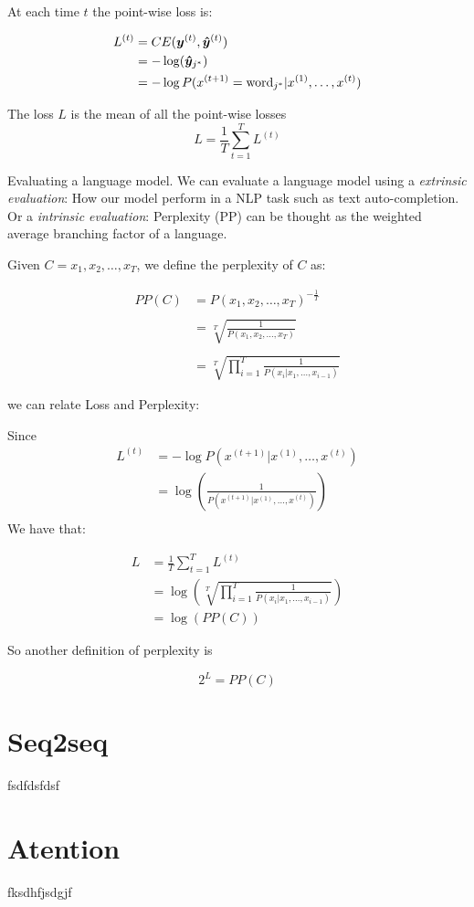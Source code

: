 At each time $t$ the point-wise loss is:

\vspace{0.2cm}

\begin{align}
L^{(t)} &= CE(\bm{y}^{(t)},\bm{\hat{y}}^{(t)})\\
    &= - \log(\bm{\hat{y}}_{j^{*}})\\
        &= - \log P(x^{(t+1)} = \text{word}_{j^{*}}|x^{(1)}, \dots, x^{(t)})
\end{align}

The loss $L$ is the mean of all the point-wise losses
\begin{equation}
L=\frac{1}{T}\sum_{t=1}^{T}L^{(t)}
\end{equation}


Evaluating a language model. We can evaluate a  language model using a \textit{extrinsic evaluation}: How our model perform in a NLP task such as text auto-completion. Or a \textit{intrinsic evaluation}: Perplexity (PP) can be thought as the weighted average branching factor of a language.


Given $C= x_1, x_2, \dots, x_T$, we define the perplexity of $C$ as:

\begin{align}
PP(C) &= P(x_1, x_2, \dots, x_T)^{-\frac{1}{T}}\\
    & \\
      &= \sqrt[T]{\frac{1}{P(x_1, x_2, \dots, x_T)}}\\
      & \\
      &= \sqrt[T]{\prod_{i=1}^{T}\frac{1}{P(x_i \vert x_1,\dots, x_{i-1})}}
\end{align}

we can relate Loss and Perplexity:

Since
\begin{align}
L^{(t)} & = - \log P(x^{(t+1)} |x^{(1)}, \dots, x^{(t)})\\
& =  \log(\frac{1}{P(x^{(t+1)}|x^{(1)}, \dots, x^{(t)})})\\
\end{align}
We have that:

\begin{align}
        L &=\frac{1}{T} \sum_{t=1}^{T} L^{(t)}\\
          &= \log\left( \sqrt[T]{\prod_{i=1}^{T}\frac{1}{P(x_i \vert x_1,\dots, x_{i-1})}} \right)\\
          &= \log(PP(C))
\end{align}

So another definition of perplexity is

\begin{equation}
2^{L} = PP(C)
\end{equation}





\section{Seq2seq}
\label{sec:Seq2seq}

fsdfdsfdsf



\section{Atention}
\label{sec:Atention}

fksdhfjsdgjf

